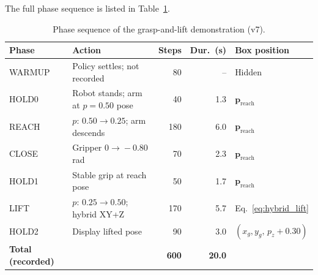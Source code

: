 The full phase sequence is listed in Table~\ref{tab:phases}.

\begin{table}[htbp]
  \centering
  \caption{Phase sequence of the grasp-and-lift demonstration (v7).}
  \label{tab:phases}
  \renewcommand{\arraystretch}{1.1}
  \begin{tabular}{llrrl}
    \toprule
    \textbf{Phase} & \textbf{Action} &
    \textbf{Steps} & \textbf{Dur.\ (s)} & \textbf{Box position} \\
    \midrule
    WARMUP & Policy settles; not recorded           & 80  & --  & Hidden \\
    HOLD0  & Robot stands; arm at $p=0.50$ pose     & 40  & 1.3 & $\mathbf{p}_\text{reach}$ \\
    REACH  & $p$: $0.50\!\to\!0.25$; arm descends   & 180 & 6.0 & $\mathbf{p}_\text{reach}$ \\
    CLOSE  & Gripper $0\!\to\!-0.80$\,rad           & 70  & 2.3 & $\mathbf{p}_\text{reach}$ \\
    HOLD1  & Stable grip at reach pose              & 50  & 1.7 & $\mathbf{p}_\text{reach}$ \\
    LIFT   & $p$: $0.25\!\to\!0.50$; hybrid XY+Z   & 170 & 5.7 & Eq.~\eqref{eq:hybrid_lift} \\
    HOLD2  & Display lifted pose                    & 90  & 3.0 & $(x_g,y_g,\,p_{z}+0.30)$ \\
    \midrule
    \textbf{Total (recorded)} & & \textbf{600} & \textbf{20.0} & \\
    \bottomrule
  \end{tabular}
\end{table}
